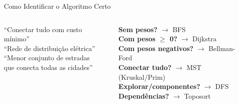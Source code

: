 \documentclass[aspectratio=169,10pt]{beamer}
\begin{document}
\begin{frame}{Como Identificar o Algoritmo Certo}
\begin{columns}[t]
      \vspace{0.1cm}
      \begin{tcolorbox}[caixaGrafo,title={Sinais de MST}]
        \footnotesize
        ``Conectar tudo com custo mínimo''\\
        ``Rede de distribuição elétrica''\\
        ``Menor conjunto de estradas\\
        que conecta todas as cidades''
      \end{tcolorbox}
      \vspace{0.1cm}
      \begin{tcolorbox}[caixaAmarelo,title={Pergunta mágica}]
        \footnotesize
        \textbf{Sem pesos?} $\to$ BFS\\
        \textbf{Com pesos $\ge$ 0?} $\to$ Dijkstra\\
        \textbf{Com pesos negativos?} $\to$ Bellman-Ford\\
        \textbf{Conectar tudo?} $\to$ MST (Kruskal/Prim)\\
        \textbf{Explorar/componentes?} $\to$ DFS\\
        \textbf{Dependências?} $\to$ Toposort
      \end{tcolorbox}
  \end{columns}
\end{frame}
\end{document}
